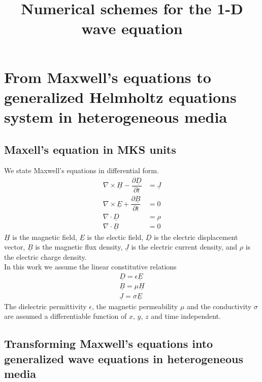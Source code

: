 \documentclass[12pt,twoside]{article}
\begin{document}
\title{Numerical schemes for the 1-D wave equation}

\newpage

\section{From Maxwell's equations to generalized Helmholtz equations system in heterogeneous media}

\subsection{Maxell's equation in MKS units}
We state Maxwell's equations in differential form.
\begin{subequations}

	\begin{align}
        \nabla \times \underline{H}-\dfrac{\partial \underline{D}}{\partial t} &= \underline{J}  \label{eqns:CurlH_Maxwell}	\\	
        \nabla \times \underline{E} + \dfrac{\partial \underline{B}}{\partial t}&= 0  \label{eqns:CurlE_Maxwell} \\
		\nabla \cdot \underline{D} &=  \rho	 \label{eqns:DivD_Maxwell}\\		
		\nabla \cdot \underline{B} &= 0	
	\end{align}
\end{subequations}
$\underline{H}$ is the magnetic field, $\underline{E}$ is the electic field, $\underline{D}$ is the electric displacement vector, $\underline{B}$ is the magnetic flux density, $\underline{J}$ is the electric current density, and $\rho$ is the electric charge density.\\
In this work we assume the linear constitutive relations 
\begin{subequations}
\begin{align}
        \underline{D} = \epsilon \underline{E} \label{eqns:constitutiveDepsE}\\
        \underline{B} = \mu \underline{H}	\label{eqns:constitutiveBH}\\
        \underline{J} = \sigma \underline{E}
\end{align}
\end{subequations}
The dielectric permittivity $\epsilon$, the magnetic permeability $\mu$ and the conductivity $\sigma$ are assumed a differentiable function of $x$, $y$, $z$ and time independent.



\subsection{Transforming Maxwell's equations into generalized wave equations in heterogeneous media}
\end{document}
